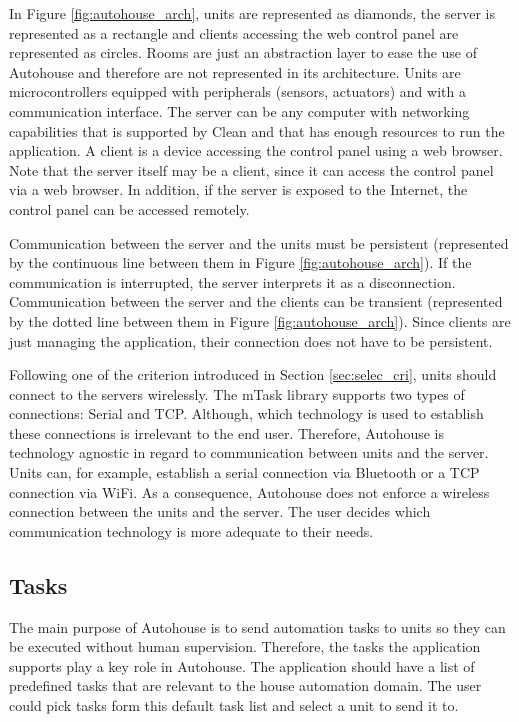 In Figure \ref{fig:autohouse_arch}, units are represented as diamonds, the server is represented as a rectangle and clients accessing the web control panel are represented as circles. Rooms are just an abstraction layer to ease the use of Autohouse and therefore are not represented in its architecture. Units are microcontrollers equipped with peripherals (sensors, actuators) and with a communication interface. The server can be any computer with networking capabilities that is supported by Clean and that has enough resources to run the application. A client is a device accessing the control panel using a web browser. Note that the server itself may be a client, since it can access the control panel via a web browser. In addition, if the server is exposed to the Internet, the control panel can be accessed remotely. 

Communication between the server and the units must be persistent (represented by the continuous line between them in Figure \ref{fig:autohouse_arch}). If the communication is interrupted, the server interprets it as a disconnection. Communication between the server and the clients can be transient (represented by the dotted line between them in Figure \ref{fig:autohouse_arch}). Since clients are just managing the application, their connection does not have to be persistent. 

Following one of the criterion introduced in Section \ref{sec:selec_cri}, units should connect to the servers wirelessly. The mTask library supports two types of connections: Serial and TCP. Although, which technology is used to establish these connections is irrelevant to the end user. Therefore, Autohouse is technology agnostic in regard to communication between units and the server. Units can, for example, establish a serial connection via Bluetooth or a TCP connection via WiFi. As a consequence, Autohouse does not enforce a wireless connection between the units and the server. The user decides which communication technology is more adequate to their needs.

\subsection{Tasks}

The main purpose of Autohouse is to send automation tasks to units so they can be executed without human supervision. Therefore, the tasks the application supports play a key role in Autohouse. The application should have a list of predefined tasks that are relevant to the house automation domain. The user could pick tasks form this default task list and select a unit to send it to.


